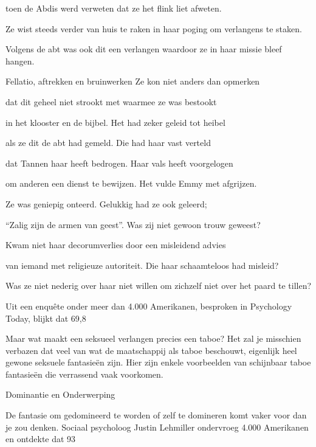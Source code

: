toen de Abdis werd verweten
dat ze het flink liet afweten.

Ze wist steeds verder van huis te raken
in haar poging om verlangens te staken.

Volgens de abt was ook dit een verlangen
waardoor ze in haar missie bleef hangen.

Fellatio, aftrekken en bruinwerken
Ze kon niet anders dan opmerken

dat dit geheel niet strookt
met waarmee ze was bestookt

in het klooster en de bijbel.
Het had zeker geleid tot heibel

als ze dit de abt had gemeld.
Die had haar vast verteld

dat Tannen haar heeft bedrogen.
Haar vals heeft voorgelogen

om anderen een dienst te bewijzen.
Het vulde Emmy met afgrijzen.

Ze was geniepig onteerd.
Gelukkig had ze ook geleerd;

“Zalig zijn de armen van geest”.
Was zij niet gewoon trouw geweest?

Kwam niet haar decorumverlies
door een misleidend advies

van iemand met religieuze autoriteit.
Die haar schaamteloos had misleid?

Was ze niet nederig over haar niet willen
om zichzelf niet over het paard te tillen?

Uit een enquête onder meer dan 4.000 Amerikanen, besproken in Psychology Today, blijkt dat 69,8 %

Maar wat maakt een seksueel verlangen precies een taboe? Het zal je misschien verbazen dat veel van wat de maatschappij als taboe beschouwt, eigenlijk heel gewone seksuele fantasieën zijn. Hier zijn enkele voorbeelden van schijnbaar taboe fantasieën die verrassend vaak voorkomen.

Dominantie en Onderwerping

De fantasie om gedomineerd te worden of zelf te domineren komt vaker voor dan je zou denken. Sociaal psycholoog Justin Lehmiller ondervroeg 4.000 Amerikanen en ontdekte dat 93 %

